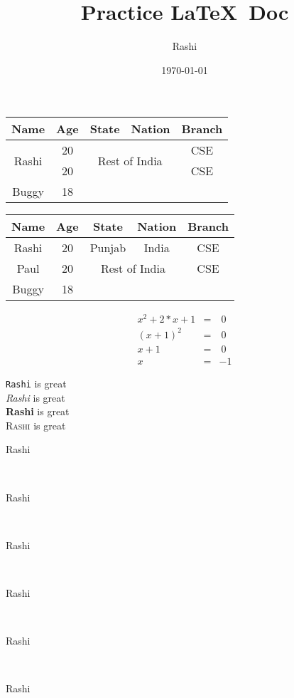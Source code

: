 \documentclass[12pt]{article}
\begin{document}
	
	\title{Practice \LaTeX \ Doc}
	\author{Rashi}
	\date{\today}
	\maketitle
	
	\tableofcontents
	\vspace{2cm}
	\begin{tabular}{| c | c | c | c | c |}
		\hline \hline
		Name & Age & State & Nation & Branch \\
		\hline
		\multirow{2}{*}{Rashi} & 20 &\multicolumn{2}{c}{\multirow{2}{*}{Rest of India}} \vline & CSE \\ \cline{2-2} \cline{5-5}
		& 20 & \multicolumn{2}{c}{} \vline& CSE \\ 
		\hline
		Buggy & 18 & & & \\
		\hline \hline
	\end{tabular}
	\begin{tabular}{| c | c | c | c | c |}
		\hline \hline
		Name & Age & State & Nation & Branch \\
		\hline
		Rashi & 20 & Punjab & India & CSE \\ \hline
		Paul & 20 & \multicolumn{2}{c}{Rest of India} \vline & CSE \\ \hline
		Buggy & 18 & & & \\
		\hline \hline
	\end{tabular}

	\begin{center}	
		\begin{eqnarray}
		x^2+2*x+1&=& \ 0 \\
		(x+1)^2&=&\ 0 \\
		x+1&=& \ 0 \\
		x&=&-1
		\end{eqnarray}
		
		\texttt{Rashi} is great \\
		\textit{Rashi} is great \\
		\vspace{5cm}
		\textbf{Rashi} is great \\
		\textsc{Rashi} is great \\
		\begin{large}Rashi\end{large}\\
		\begin{Large}Rashi\end{Large}\\
		\begin{huge}Rashi\end{huge}\\
		\begin{Huge}Rashi\end{Huge}\\
		\begin{small}Rashi\end{small}\\
		\begin{tiny}Rashi\end{tiny}
		
	\end{center}
\end{document}
